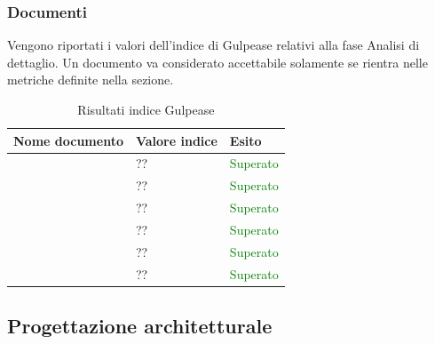 	 	\subsubsection{Documenti}
	 	Vengono riportati i valori dell'indice di Gulpease relativi alla fase Analisi di dettaglio. Un documento va considerato accettabile solamente se rientra nelle metriche definite nella sezione.
		\begin{table}[!ht]
			\begin{center}
				\begin{tabularx}{0.9\textwidth}{|l|l|X|}
					\hline
					\textbf{Nome documento} & \textbf{Valore indice} & \textbf{Esito}\\
					\hline						
					\docNameVersionAdR & ?? & \textcolor{green}{Superato}\\
					\hline
					\docNameVersionGlo & ?? & \textcolor{green}{Superato}\\
					\hline					
					\docNameVersionNdP & ?? & \textcolor{green}{Superato}\\
					\hline					
					\docNameVersionPdP & ?? & \textcolor{green}{Superato}\\
					\hline					
					\docNameVersionPdQ & ?? & \textcolor{green}{Superato}\\
					\hline					
					\docNameVersionSdF & ?? & \textcolor{green}{Superato}\\
					\hline				
				\end{tabularx}
			\end{center}
			\caption{Risultati indice Gulpease}
		\end{table}
		\subsection{Progettazione architetturale}
